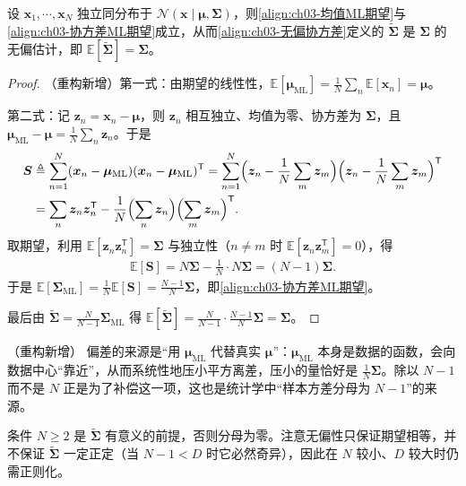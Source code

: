 \documentclass[../../main.tex]{subfiles}
\begin{document}
\begin{proposition}[最大似然估计量的期望与无偏修正]\label{proposition:ch03-GaussML期望}
设 $\boldsymbol{x}_1,\cdots,\boldsymbol{x}_N$ 独立同分布于 $\mathcal{N}(\boldsymbol{x}\mid\boldsymbol{\mu},\boldsymbol{\Sigma})$，则\eqref{align:ch03-均值ML期望}与\eqref{align:ch03-协方差ML期望}成立，从而\eqref{align:ch03-无偏协方差}定义的 $\tilde{\boldsymbol{\Sigma}}$ 是 $\boldsymbol{\Sigma}$ 的无偏估计，即 $\mathbb{E}[\tilde{\boldsymbol{\Sigma}}]=\boldsymbol{\Sigma}$。
\end{proposition}
\begin{proof}
（重构新增）第一式：由期望的线性性，$\mathbb{E}[\boldsymbol{\mu}_{\mathrm{ML}}]=\frac{1}{N}\sum_n\mathbb{E}[\boldsymbol{x}_n]=\boldsymbol{\mu}$。

第二式：记 $\boldsymbol{z}_n=\boldsymbol{x}_n-\boldsymbol{\mu}$，则 $\boldsymbol{z}_n$ 相互独立、均值为零、协方差为 $\boldsymbol{\Sigma}$，且 $\boldsymbol{\mu}_{\mathrm{ML}}-\boldsymbol{\mu}=\frac{1}{N}\sum_n\boldsymbol{z}_n$。于是
\begin{align*}
\boldsymbol{S}&\triangleq\sum_{n=1}^{N}(\boldsymbol{x}_n-\boldsymbol{\mu}_{\mathrm{ML}})(\boldsymbol{x}_n-\boldsymbol{\mu}_{\mathrm{ML}})^{\mathsf{T}}=\sum_{n=1}^{N}\Bigl(\boldsymbol{z}_n-\frac{1}{N}\sum_{m}\boldsymbol{z}_m\Bigr)\Bigl(\boldsymbol{z}_n-\frac{1}{N}\sum_{m}\boldsymbol{z}_m\Bigr)^{\mathsf{T}}\\
&=\sum_{n}\boldsymbol{z}_n\boldsymbol{z}_n^{\mathsf{T}}-\frac{1}{N}\Bigl(\sum_{n}\boldsymbol{z}_n\Bigr)\Bigl(\sum_{m}\boldsymbol{z}_m\Bigr)^{\mathsf{T}}.
\end{align*}
取期望，利用 $\mathbb{E}[\boldsymbol{z}_n\boldsymbol{z}_n^{\mathsf{T}}]=\boldsymbol{\Sigma}$ 与独立性（$n\neq m$ 时 $\mathbb{E}[\boldsymbol{z}_n\boldsymbol{z}_m^{\mathsf{T}}]=0$），得
\begin{align*}
\mathbb{E}[\boldsymbol{S}]=N\boldsymbol{\Sigma}-\frac{1}{N}\cdot N\boldsymbol{\Sigma}=(N-1)\boldsymbol{\Sigma}.
\end{align*}
于是 $\mathbb{E}[\boldsymbol{\Sigma}_{\mathrm{ML}}]=\frac{1}{N}\mathbb{E}[\boldsymbol{S}]=\frac{N-1}{N}\boldsymbol{\Sigma}$，即\eqref{align:ch03-协方差ML期望}。

最后由 $\tilde{\boldsymbol{\Sigma}}=\frac{N}{N-1}\boldsymbol{\Sigma}_{\mathrm{ML}}$ 得 $\mathbb{E}[\tilde{\boldsymbol{\Sigma}}]=\frac{N}{N-1}\cdot\frac{N-1}{N}\boldsymbol{\Sigma}=\boldsymbol{\Sigma}$。
\end{proof}

\begin{remark}（重构新增）
偏差的来源是“用 $\boldsymbol{\mu}_{\mathrm{ML}}$ 代替真实 $\boldsymbol{\mu}$”：$\boldsymbol{\mu}_{\mathrm{ML}}$ 本身是数据的函数，会向数据中心“靠近”，从而系统性地压小平方离差，压小的量恰好是 $\frac{1}{N}\boldsymbol{\Sigma}$。除以 $N-1$ 而不是 $N$ 正是为了补偿这一项，这也是统计学中“样本方差分母为 $N-1$”的来源。

条件 $N\geqslant2$ 是 $\tilde{\boldsymbol{\Sigma}}$ 有意义的前提，否则分母为零。注意无偏性只保证期望相等，并不保证 $\tilde{\boldsymbol{\Sigma}}$ 一定正定（当 $N-1<D$ 时它必然奇异），因此在 $N$ 较小、$D$ 较大时仍需正则化。
\end{remark}
\end{document}
